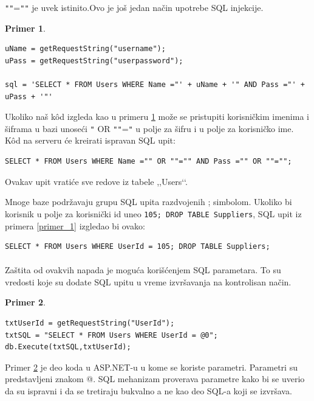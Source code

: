 \documentclass[a4paper]{article}
\theoremstyle{break}
\newtheorem{primer}{Primer}[section]
\begin{document}
{\texttt{"}\texttt{"}=\texttt{"}\texttt{"} je uvek istinito.Ovo je još jedan način upotrebe SQL injekcije.
\begin{primer}
\label{primer_2}
\begin{lstlisting}[frame=single]
uName = getRequestString("username");
uPass = getRequestString("userpassword");

sql = 'SELECT * FROM Users WHERE Name ="' + uName + '" AND Pass ="' + uPass + '"'
\end{lstlisting}
\end{primer}

\noindent Ukoliko naš k\^{o}d izgleda kao u primeru \ref{primer_2} može se pristupiti korisničkim imenima i šiframa u bazi unoseći \texttt{"} OR \texttt{"}\texttt{"}=\texttt{"} u polje za šifru i u polje za korisničko ime. K\^{o}d na serveru će kreirati ispravan SQL upit:

\begin{lstlisting}[frame=single]
SELECT * FROM Users WHERE Name ="" OR ""="" AND Pass ="" OR ""="";
\end{lstlisting}
\noindent Ovakav upit vratiće sve redove iz tabele ,,Users‘‘. 

Mnoge baze podržavaju grupu SQL upita razdvojenih ; simbolom. Ukoliko bi korisnik u polje za korisnički id uneo \texttt{105; DROP TABLE Suppliers}, SQL upit iz primera \ref{primer_1} izgledao bi ovako:

\begin{lstlisting}[frame=single]
SELECT * FROM Users WHERE UserId = 105; DROP TABLE Suppliers; 
\end{lstlisting}
\paragraph{}
Zaštita od ovakvih napada je moguća korišćenjem SQL parametara. To su vredosti koje su dodate SQL upitu u vreme izvršavanja na kontrolisan način.

\begin{primer}
\label{primer_3}
\begin{lstlisting}[frame=single]
txtUserId = getRequestString("UserId");
txtSQL = "SELECT * FROM Users WHERE UserId = @0";
db.Execute(txtSQL,txtUserId);
\end{lstlisting}
\end{primer}
\noindent Primer \ref{primer_3} je deo koda u ASP.NET-u u kome se koriste parametri. Parametri su predstavljeni znakom @. SQL mehanizam proverava parametre kako bi se uverio da su ispravni i da se tretiraju bukvalno a ne kao deo SQL-a koji se izvršava.

}
\end{document}

